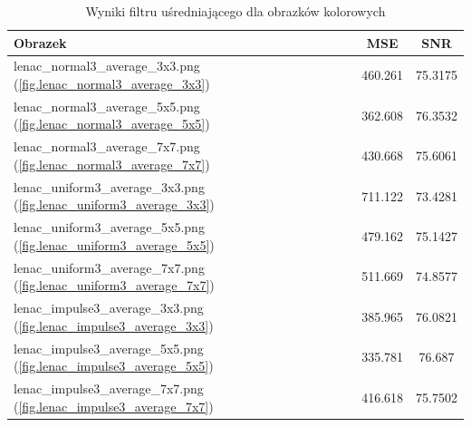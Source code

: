 \documentclass{classrep}
\begin{document}
\begin{table}
  \centering
  \begin{tabular}{|l|c|c|}
    \hline
    \textbf{Obrazek} & \textbf{MSE} & \textbf{SNR} \\
    \hline\hline
    lenac\_normal3\_average\_3x3.png (\ref{fig.lenac_normal3_average_3x3}) & 460.261 & 75.3175 \\
    \hline
    lenac\_normal3\_average\_5x5.png (\ref{fig.lenac_normal3_average_5x5}) & 362.608 & 76.3532 \\
    \hline
    lenac\_normal3\_average\_7x7.png (\ref{fig.lenac_normal3_average_7x7}) & 430.668 & 75.6061 \\
    \hline
    lenac\_uniform3\_average\_3x3.png (\ref{fig.lenac_uniform3_average_3x3}) & 711.122 & 73.4281 \\
    \hline
    lenac\_uniform3\_average\_5x5.png (\ref{fig.lenac_uniform3_average_5x5}) & 479.162 & 75.1427 \\
    \hline
    lenac\_uniform3\_average\_7x7.png (\ref{fig.lenac_uniform3_average_7x7}) & 511.669 & 74.8577 \\
    \hline
    lenac\_impulse3\_average\_3x3.png (\ref{fig.lenac_impulse3_average_3x3}) & 385.965 & 76.0821 \\
    \hline
    lenac\_impulse3\_average\_5x5.png (\ref{fig.lenac_impulse3_average_5x5}) & 335.781 & 76.687 \\
    \hline
    lenac\_impulse3\_average\_7x7.png (\ref{fig.lenac_impulse3_average_7x7}) & 416.618 & 75.7502 \\
    \hline
  \end{tabular}
  \caption{Wyniki filtru uśredniającego dla obrazków kolorowych}
  \label{tab.lenac_average}
\end{table}
\end{document}
